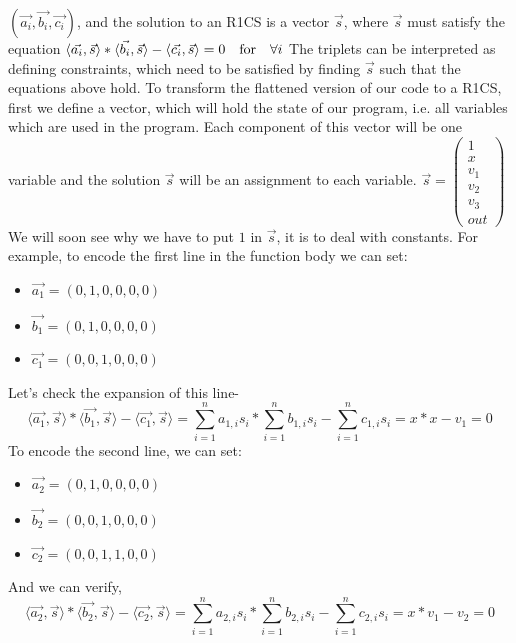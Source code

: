 \documentclass[12pt,letterpaper]{article}
\begin{document}
$(\vec{a_i},\vec{b_i},\vec{c_i})$, and the solution to an R1CS is a vector $\Vec{s}$, where $\vec{s}$ must satisfy the equation $\langle \vec{a_i}, \vec{s} \rangle \ast \langle \vec{b_i}, \vec{s} \rangle - \langle \vec{c_i}, \vec{s} \rangle = 0 \quad \textrm{for} \quad \forall i\\$
The triplets can be interpreted as defining constraints, which need to be satisfied by finding $\vec{s}$ such that the equations above hold. To transform the flattened version of our code to a R1CS, first we define a vector, which will hold the state of our program, i.e. all variables which are used in the program. Each component of this vector will be one variable and the solution $\vec{s}$ will be an assignment to each variable.
$
\vec{s} = \begin{pmatrix} 
1 \\ 
x \\ 
v_1 \\ 
v_2 \\
v_3 \\
out
\end{pmatrix}
$
We will soon see why we have to put $1$ in $\vec{s}$, it is to deal with constants.
For example, to encode the first line in the function body we can set:\\
\begin{itemize}
    \item $\vec{a_1}=(0,1,0,0,0,0)$
    \item $\vec{b_1}=(0,1,0,0,0,0)$
    \item $\vec{c_1}=(0,0,1,0,0,0)$
\end{itemize}
Let's check the expansion of this line-\\
\begin{equation} 
\langle \vec{a_1}, \vec{s} \rangle \ast \langle \vec{b_1}, \vec{s} \rangle - \langle \vec{c_1}, \vec{s} \rangle = \sum_{i=1}^{n} a_{1,i} s_i \ast \sum_{i=1}^{n} b_{1,i} s_i - \sum_{i=1}^{n} c_{1,i} s_i = x \ast x - v_1 = 0 
\end{equation}
To encode the second line, we can set:
\begin{itemize}
    \item $\vec{a_2}=(0,1,0,0,0,0)$
    \item $\vec{b_2}=(0,0,1,0,0,0)$
    \item $\vec{c_2}=(0,0,1,1,0,0)$
\end{itemize}
And we can verify,
\begin{equation} 
\langle \vec{a_2}, \vec{s} \rangle \ast \langle \vec{b_2}, \vec{s} \rangle - \langle \vec{c_2}, \vec{s} \rangle = \sum_{i=1}^{n} a_{2,i} s_i \ast \sum_{i=1}^{n} b_{2,i} s_i - \sum_{i=1}^{n} c_{2,i} s_i = x \ast v_1 - v_2 = 0 
\end{equation}
\end{document}
